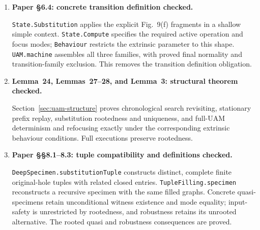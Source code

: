 \begin{enumerate}
General erasure commutes with simultaneous expansion, preserving the joined
coordinate. Consequently expansion of an already focussed context is
focus-preservingly isomorphic to filling its erasure and then inserting a focus.
Entering/exiting adjacency in the original context is equivalent to the checked
coordinate boundary test. Under the settled hypotheses of point~(3), search
enabled on either specimen side yields synchronized actual-state steps to rooted
endpoints at a remote coordinate. The proof allows recursive endpoint renaming
and uses output closure to exclude exiting backtracking focuses.

Section~\ref{sec:concrete-specimen-system} now packages that coordinate as
an allowed unique-hole specimen with recursive fillings and closed endpoints.
Its full-UAM context-step theorem constructs the abstract locality field.
Original-hole tuple compatibility is proved in Section~\ref{sec:tuple-safety};
contextual search adequacy is established in Section~\ref{sec:contextual-search}.
\item \textbf{Paper \S6.4: concrete transition definition checked.}\par
\texttt{State.Substitution} applies the explicit Fig.~9(f) fragments in a
shallow simple context. \texttt{State.Compute} specifies the required active
operation and focus modes; \texttt{Behaviour} restricts the extrinsic parameter
to this shape. \texttt{UAM.machine} assembles all three families, with proved
final normality and transition-family exclusion. This removes the transition
definition obligation.
\item \textbf{Lemma~24, Lemmas~27--28, and Lemma~3: structural theorem checked.}\par
Section~\ref{sec:uam-structure} proves chronological search revisiting,
stationary prefix replay, substitution rootedness and uniqueness, and
full-UAM determinism and refocusing exactly under the corresponding extrinsic
behaviour conditions. Full executions preserve rootedness.
\item \textbf{Paper \S\S8.1--8.3: tuple compatibility and definitions checked.}\par
\texttt{DeepSpecimen.substitutionTuple} constructs distinct, complete finite
original-hole tuples with related closed entries. \texttt{TupleFilling.specimen}
reconstructs a recursive specimen with the same filled graphs. Concrete
quasi-specimens retain unconditional witness existence and mode equality;
input-safety is unrestricted by rootedness, and robustness retains its
unrooted alternative. The rooted quasi and robustness consequences are proved.

\end{enumerate}
